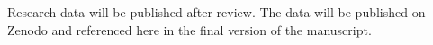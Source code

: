 \documentclass[pdflatex,sn-mathphys-num]{sn-jnl}%
\theoremstyle{thmstyleone}%
\theoremstyle{thmstyletwo}%
\theoremstyle{thmstylethree}%
\begin{document}
   Research data will be published after review. The data will be published on Zenodo and referenced here in the final version of the manuscript.








\end{document}
